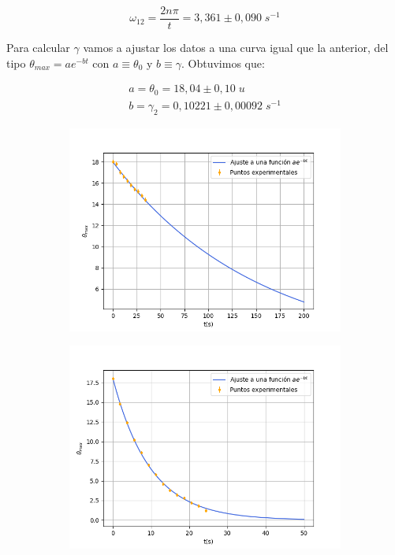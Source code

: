 \documentclass[a4paper,12pt,titlepage]{article}
\begin{document}
\begin{equation}
    \omega_{12} = \frac{2n\pi}{t} = 3,361 \pm 0,090\; s^{-1}
\end{equation}

Para calcular $\gamma$ vamos a ajustar los datos a una curva igual que la anterior, del tipo $\theta_{max}=ae^{-bt}$ con $a\equiv \theta_0$ y $b\equiv \gamma$. Obtuvimos que:

\begin{equation}
    \begin{gathered}
        a = \theta_0 = 18,04\pm 0,10 \; u \\
        b = \gamma_2 = 0,10221 \pm 0,00092 \; s^{-1}
    \end{gathered}
\end{equation}

\begin{figure}[h!]
    \centering
    \begin{subfigure}{0.45\textwidth}
        \centering
        \includegraphics[width=1.1\linewidth]{Images/I0ajuste.png}
    \end{subfigure}
    \begin{subfigure}{0.45\textwidth}
        \centering
        \includegraphics[width=1.1\linewidth]{Images/I3ajuste.png}

\end{subfigure}
\end{figure}
\end{document}
